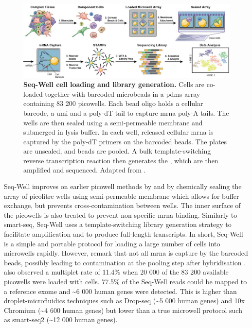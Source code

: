 \begin{figure}[ht]
	\centerfloat
	\includegraphics[width=\textwidth]{./ims/gierahn2017.png}
	\caption[Seq-Well cell loading and library generation]{\textbf{Seq-Well cell loading and library generation.} Cells are co-loaded together with barcoded microbeads in a \acrshort{pdms} array containing 83 200 picowells. Each bead oligo holds a cellular barcode, a \acrshort{umi} and a poly-dT tail to capture \acrshort{mrna} poly-A tails. The wells are then sealed using a semi-permeable membrane and submerged in lysis buffer. In each well, released cellular \acrshort{mrna} is captured by the poly-dT primers on the barcoded beads. The plates are unsealed, and beads are pooled. A bulk template-switching reverse transcription reaction then generates the , which are then amplified and sequenced. Adapted from \cite{gierahn2017}.}
	\label{fig:gierahn2017}
\end{figure}

Seq-Well improves on earlier picowell methods by \cite{fan2015} and \cite{yuan2016} by chemically sealing the array of picolitre wells using semi-permeable membrane which allows for buffer exchange, but prevents cross-contamination between wells. The inner surface of the picowells is also treated to prevent non-specific \acrshort{mrna} binding. Similarly to \acrshort{smart-seq}, Seq-Well uses a template-switching library generation strategy to facilitate amplification and to produce full-length transcripts. In short, Seq-Well is a simple and portable protocol for loading a large number of cells into microwells rapidly. However, \citeauthor{zilionis2017} remark that not all \acrshort{mrna} is capture by the barcoded beads, possibly leading to contamination at the pooling step after hybridisation \citep{zilionis2017}. \citeauthor{gierahn2017} also observed a multiplet rate of 11.4\% when 20 000 of the 83 200 available picowells were loaded with cells. 77.5\% of the Seq-Well reads could be mapped to a reference exome and {\textasciitilde}6 000 human genes were detected. This is higher than droplet-microfluidics techniques such as Drop-seq ({\textasciitilde}5 000 human genes) and 10x Chromium ({\textasciitilde}4 600 human genes) but lower than a true microwell protocol such as \acrshort{smart-seq}2 ({\textasciitilde}12 000 human genes).\pms

